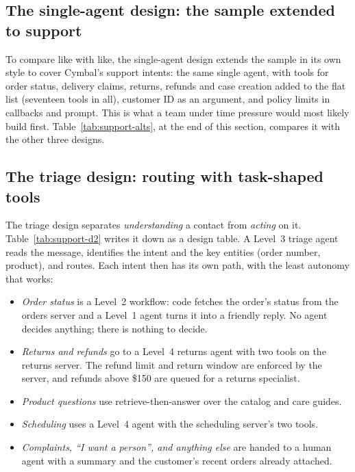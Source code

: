 \subsection{The single-agent design: the sample extended to support}

To compare like with like, the single-agent design extends the sample in its own style to cover Cymbal's support intents: the same single agent, with tools for order status, delivery claims, returns, refunds and case creation added to the flat list (seventeen tools in all), customer ID as an argument, and policy limits in callbacks and prompt. This is what a team under time pressure would most likely build first. Table~\ref{tab:support-alts}, at the end of this section, compares it with the other three designs.

\subsection{The triage design: routing with task-shaped tools}

The triage design separates \emph{understanding} a contact from \emph{acting} on it. Table~\ref{tab:support-d2} writes it down as a design table. A Level~3 triage agent reads the message, identifies the intent and the key entities (order number, product), and routes. Each intent then has its own path, with the least autonomy that works:
\begin{itemize}[itemsep=1pt]
  \item \emph{Order status} is a Level~2 workflow: code fetches the order's status from the orders server and a Level~1 agent turns it into a friendly reply. No agent decides anything; there is nothing to decide.
  \item \emph{Returns and refunds} go to a Level~4 returns agent with two tools on the returns server. The refund limit and return window are enforced by the server, and refunds above \$150 are queued for a returns specialist.
  \item \emph{Product questions} use retrieve-then-answer over the catalog and care guides.
  \item \emph{Scheduling} uses a Level~4 agent with the scheduling server's two tools.
  \item \emph{Complaints, ``I want a person'', and anything else} are handed to a human agent with a summary and the customer's recent orders already attached.
\end{itemize}

